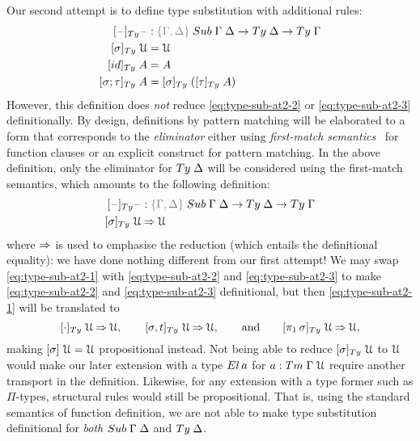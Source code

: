 \documentclass[a4paper,UKenglish,numberwithinsect,cleveref,thm-restate]{lipics-v2021}
\newcommand{\LT}[2][]{\todo[inline,author={L-T},caption={},#1]{#2}}
\begin{document}
Our second attempt is to define type substitution with additional rules:
\begin{alignat}{3}
[\blank]_{\Ty} \blank &: \implicit{\Gamma, \Delta} \; \Sub\;\Gamma\;\Delta \to \Ty\;\Delta \to \Ty\;\Gamma \nonumber \\
[ \sigma ]_{\Ty}       \;\UU  & = \UU                                   \label{eq:type-sub-at2-1} \\
[ \idS ]_{\Ty}         \;A    & = A                                     \label{eq:type-sub-at2-2} \\
[ \sigma ; \tau ]_{\Ty}\;A    & = [ \sigma ]_{\Ty}\;([ \tau ]_{\Ty}\;A) \label{eq:type-sub-at2-3}
\end{alignat}
However, this definition does \emph{not} reduce \eqref{eq:type-sub-at2-2} or \eqref{eq:type-sub-at2-3} definitionally.
By design, definitions by pattern matching will be elaborated to a form that corresponds to the \emph{eliminator} either using \emph{first-match semantics}~\cite{Cockx2020a} for function clauses or an explicit construct for pattern matching.
\LT[noinline]{How about \Coq and \Lean?}
In the above definition, only the eliminator for $\Ty\;\Delta$ will be considered using the first-match semantics, which amounts to the following definition:
\begin{alignat*}{3}
[\blank]_{\Ty} \blank &: \implicit{\Gamma, \Delta} \; \Sub\;\Gamma\;\Delta \to \Ty\;\Delta \to \Ty\;\Gamma \\
[ \sigma ]_{\Ty}\;\UU  & \reduce \UU
\end{alignat*}
where $\mathbin{\Rightarrow}$ is used to emphasise the reduction (which entails the definitional equality): we have done nothing different from our first attempt! 
We may swap \eqref{eq:type-sub-at2-1} with \eqref{eq:type-sub-at2-2} and \eqref{eq:type-sub-at2-3} to make \eqref{eq:type-sub-at2-2} and \eqref{eq:type-sub-at2-3} definitional, but then \eqref{eq:type-sub-at2-1} will be translated to 
\[
[ \emptysub ]_{\Ty}\;\UU         \reduce \UU, \qquad
[ \sigma, t ]_{\Ty}\;\UU         \reduce \UU, \qquad\text{and}\qquad 
[ \pi_1\,\sigma ]_{\Ty}\;\UU     \reduce \UU,
\]
making $[\sigma]\;\mathcal{U} = \mathcal{U}$ propositional instead.
Not being able to reduce $[ \sigma ]_{\Ty}\;\UU$ to $\mathcal{U}$ would make our later extension with a type $\El\,a$ for $a : \Tm\;\Gamma\;\UU$ require another transport in the definition.
Likewise, for any extension with a type former such as $\Pi$-types, structural rules would still be propositional.
That is, using the standard semantics of function definition, we are not able to make type substitution definitional for \emph{both} $\Sub\;\Gamma\;\Delta$ and $\Ty\;\Delta$.
\end{document}
